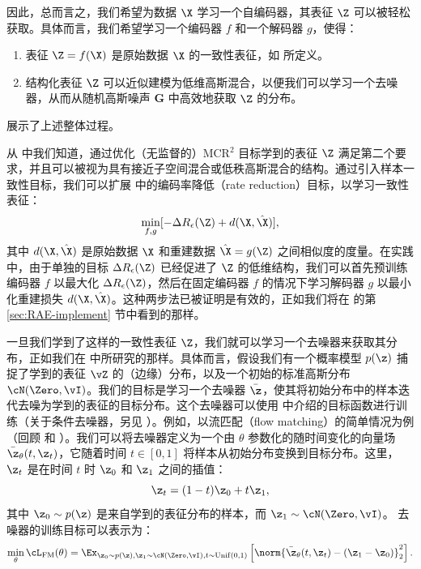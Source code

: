\documentclass[../../book-main_zh.tex]{subfiles}
\begin{document}
因此，总而言之，我们希望为数据 $\X$ 学习一个自编码器，其表征 $\Z$ 可以被轻松获取。具体而言，我们希望学习一个编码器 $f$ 和一个解码器 $g$，使得：
\begin{enumerate}
    \item 表征 $\Z = f(\X)$ 是原始数据 $\X$ 的一致性表征，如  所定义。
    \item 结构化表征 $\Z$ 可以近似建模为低维高斯混合，以便我们可以学习一个去噪器，从而从随机高斯噪声 $\boldsymbol{G}$ 中高效地获取 $\Z$ 的分布。
\end{enumerate}
 展示了上述整体过程。

从  中我们知道，通过优化（无监督的）MCR$^2$ 目标学到的表征 $\Z$ 满足第二个要求，并且可以被视为具有接近子空间混合或低秩高斯混合的结构。通过引入样本一致性目标，我们可以扩展  中的编码率降低（rate reduction）目标，以学习一致性表征：
\begin{equation}
    \min_{f, g}
    [ - \Delta R_{\epsilon}(\Z) + d(\X, \hat \X)],
    \label{eqn:autoencode-consistent}
\end{equation}
其中 $d(\X, \hat \X)$ 是原始数据 $\X$ 和重建数据 $\hat \X = g(\Z)$ 之间相似度的度量。在实践中，由于单独的目标 $\Delta R_{\epsilon}(\Z)$ 已经促进了 $\Z$ 的低维结构，我们可以首先预训练编码器 $f$ 以最大化 $\Delta R_{\epsilon}(\Z)$，然后在固定编码器 $f$ 的情况下学习解码器 $g$ 以最小化重建损失 $d(\X, \hat \X)$。这种两步法已被证明是有效的，正如我们将在  的第 \ref{sec:RAE-implement} 节中看到的那样。

一旦我们学到了这样的一致性表征 $\Z$，我们就可以学习一个去噪器来获取其分布，正如我们在  中所研究的那样。具体而言，假设我们有一个概率模型 $p(\z)$ 捕捉了学到的表征 $\vZ$ 的（边缘）分布，以及一个初始的标准高斯分布 $\cN(\Zero, \vI)$。我们的目标是学习一个去噪器 $\bar{\z}$，使其将初始分布中的样本迭代去噪为学到的表征的目标分布。这个去噪器可以使用  中介绍的目标函数进行训练（关于条件去噪器，另见 ）。例如，以流匹配（flow matching）的简单情况为例（回顾  和 ）。我们可以将去噪器定义为一个由 $\theta$ 参数化的随时间变化的向量场 $\bar{\z}_{\theta}(t, \z_t)$，它随着时间 $t \in [0, 1]$ 将样本从初始分布变换到目标分布。这里，$\z_t$ 是在时间 $t$ 时 $\z_0$ 和 $\z_1$ 之间的插值：
\begin{equation}
    \z_t = (1 - t)\z_0 + t\z_1,
\end{equation}
其中 $\z_0 \sim p(\z)$ 是来自学到的表征分布的样本，而 $\z_1 \sim \cN(\Zero, \vI)$。
去噪器的训练目标可以表示为：
\begin{equation}
    \min_{\theta} \cL_{\mathrm{FM}}(\theta) = \Ex_{\z_0 \sim p(\z), \z_1 \sim
    \cN(\Zero, \vI), t \sim \mathrm{Unif}(0, 1)} \left[
    \norm{\bar{\z}_{\theta}(t,\z_t) - (\z_1 - \z_0)}_2^2 \right].
\end{equation}
\end{document}

